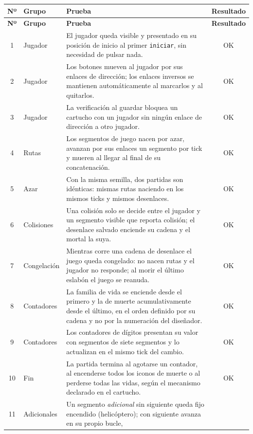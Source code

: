 \begin{longtable}{|c|l|p{8.2cm}|c|}
	\hline
	\textbf{Nº} & \textbf{Grupo} & \textbf{Prueba} & \textbf{Resultado} \\
	\hline
	\endfirsthead
	\hline
	\textbf{Nº} & \textbf{Grupo} & \textbf{Prueba} & \textbf{Resultado} \\
	\hline
	\endhead
	
	1 & Jugador & El jugador queda visible y presentado en su posición
	de inicio al primer \texttt{iniciar}, sin necesidad de pulsar nada. &
	OK \\
	\hline
	2 & Jugador & Los botones mueven al jugador por sus enlaces de
	dirección; los enlaces inversos se mantienen automáticamente al marcarlos
	y al quitarlos. & OK \\
	\hline
	3 & Jugador & La verificación al guardar bloquea un cartucho con un
	jugador sin ningún enlace de dirección a otro jugador. & OK \\
	\hline
	4 & Rutas & Los segmentos de juego nacen por azar, avanzan por sus
	enlaces un segmento por tick y mueren al llegar al final de su
	concatenación. & OK \\
	\hline
	5 & Azar & Con la misma semilla, dos partidas son idénticas: mismas
	rutas naciendo en los mismos ticks y mismos desenlaces. & OK \\
	\hline
	6 & Colisiones & Una colisión solo se decide entre el jugador y un
	segmento visible que reporta colisión; el desenlace salvado enciende su
	cadena y el mortal la suya. & OK \\
	\hline
	7 & Congelación & Mientras corre una cadena de desenlace el juego queda
	congelado: no nacen rutas y el jugador no responde; al morir el último
	eslabón el juego se reanuda. & OK \\
	\hline
	8 & Contadores & La familia de vida se enciende desde el primero y la
	de muerte acumulativamente desde el último, en el orden definido por su
	cadena y no por la numeración del diseñador. & OK \\
	\hline
	9 & Contadores & Los contadores de dígitos presentan su valor con
	segmentos de siete segmentos y lo actualizan en el mismo tick del
	cambio. & OK \\
	\hline
	10 & Fin & La partida termina al agotarse un contador, al encenderse
	todos los iconos de muerte o al perderse todas las vidas, según el
	mecanismo declarado en el cartucho. & OK \\
	\hline
	11 & Adicionales & Un segmento \emph{adicional} sin siguiente queda
	fijo encendido (helicóptero); con siguiente avanza en su propio bucle,

\end{longtable}
